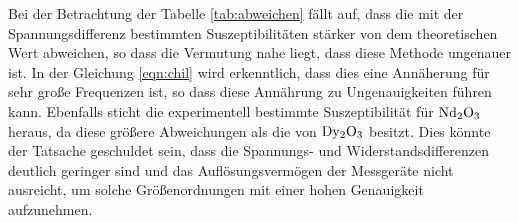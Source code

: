 Bei der Betrachtung der Tabelle \ref{tab:abweichen} fällt auf, dass die mit der Spannungsdifferenz bestimmten Suszeptibilitäten stärker von dem 
theoretischen Wert abweichen, so dass die Vermutung nahe liegt, dass diese Methode ungenauer ist. 
In der Gleichung \eqref{eqn:chil} wird erkenntlich, dass dies  eine Annäherung für sehr große Frequenzen ist, so dass diese Annährung zu Ungenauigkeiten 
führen kann.
Ebenfalls sticht die experimentell bestimmte Suszeptibilität für $\ce{Nd2O3}$ heraus, da diese größere Abweichungen als die von $\ce{Dy2O3}$
besitzt.
Dies könnte der Tatsache geschuldet sein, dass die Spannungs- und Widerstandsdifferenzen deutlich geringer sind und das Auflösungsvermögen der Messgeräte 
nicht ausreicht, um solche Größenordnungen mit einer hohen Genauigkeit aufzunehmen.